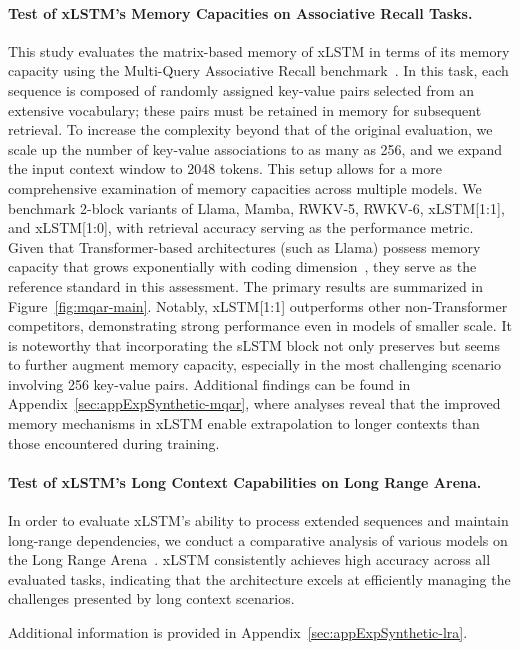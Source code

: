 \paragraph{Test of xLSTM's Memory Capacities on Associative Recall Tasks.} This study evaluates the matrix-based memory of xLSTM in terms of its memory capacity using the Multi-Query Associative Recall benchmark~\citep{Arora:23arxiv}. In this task, each sequence is composed of randomly assigned key-value pairs selected from an extensive vocabulary; these pairs must be retained in memory for subsequent retrieval. To increase the complexity beyond that of the original evaluation, we scale up the number of key-value associations to as many as 256, and we expand the input context window to 2048 tokens. This setup allows for a more comprehensive examination of memory capacities across multiple models. We benchmark 2-block variants of Llama, Mamba, RWKV-5, RWKV-6, xLSTM[1:1], and xLSTM[1:0], with retrieval accuracy serving as the performance metric. Given that Transformer-based architectures (such as Llama) possess memory capacity that grows exponentially with coding dimension~\citep{Ramsauer:21}, they serve as the reference standard in this assessment. The primary results are summarized in Figure~\ref{fig:mqar-main}. Notably, xLSTM[1:1] outperforms other non-Transformer competitors, demonstrating strong performance even in models of smaller scale. It is noteworthy that incorporating the sLSTM block not only preserves but seems to further augment memory capacity, especially in the most challenging scenario involving 256 key-value pairs. Additional findings can be found in Appendix~\ref{sec:appExpSynthetic-mqar}, where analyses reveal that the improved memory mechanisms in xLSTM enable extrapolation to longer contexts than those encountered during training.

\paragraph{Test of xLSTM's Long Context Capabilities on Long Range Arena.} In order to evaluate xLSTM's ability to process extended sequences and maintain long-range dependencies, we conduct a comparative analysis of various models on the Long Range Arena~\citep{Tay:21}. xLSTM consistently achieves high accuracy across all evaluated tasks, indicating that the architecture excels at efficiently managing the challenges presented by long context scenarios.

Additional information is provided in Appendix~\ref{sec:appExpSynthetic-lra}.

